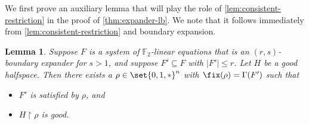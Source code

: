 \documentclass[11pt]{article}
\newtheorem{lemma}[theorem]{Lemma}
\begin{document}
We first prove an auxiliary lemma that will play the role of \autoref{lem:consistent-restriction} in the proof of \autoref{thm:expander-lb}.
We note that it follows immediately from \autoref{lem:consistent-restriction} and boundary expansion.
\begin{lemma}\label{lem:boundary-cleanup}
	Suppose $F$ is a system of $\mathbb{F}_2$-linear equations that is an $(r, s)$-boundary expander for $s > 1$, and suppose $F' \subseteq F$ with $|F'| \leq r$.
	Let $H$ be a good halfspace.
	Then there exists a $\rho \in \set{0,1,*}^n$ with $\fix(\rho) = \Gamma(F')$ such that 
	\begin{itemize}
		\item $F'$ is satisfied by $\rho$, and
		\item $H \restriction \rho$ is good.
	\end{itemize}
\end{lemma}
\end{document}
